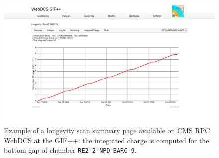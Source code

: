 	\begin{figure}[H]
        \centering
		\includegraphics[width = \linewidth]{fig/chapt5/Longevity-scan-Qint-vs-Time.png}
		\caption{\label{fig:DQM-Longevity-Qint} Example of a longevity scan summary page available on CMS RPC WebDCS at the GIF++: the integrated charge is computed for the bottom gap of chamber \texttt{RE2-2-NPD-BARC-9}.}
	\end{figure}
	
\newpage
\vfill
	
